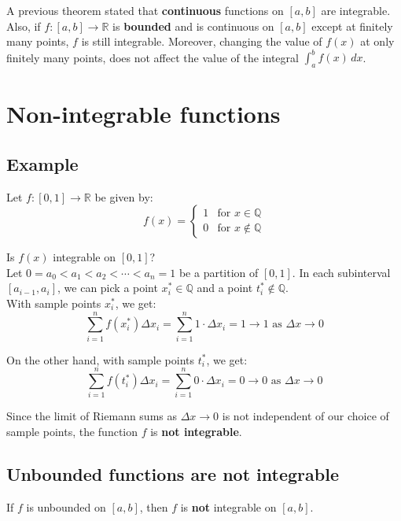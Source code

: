 \documentclass[11pt]{article}
\begin{document}
A previous theorem stated that \textbf{continuous} functions on \([a, b]\) are integrable.
\\[0pt]

Also, if \(f : [a, b] \rightarrow \mathbb{R}\) is \textbf{bounded} and is continuous on \([a, b]\) except at finitely many points, \(f\) is still integrable. Moreover, changing the value of \(f(x)\) at only finitely many points, does not affect the value of the integral \(\int_a^b f(x) \, dx\).


\section{Non-integrable functions}
\label{sec:org1be2553}

\subsection{Example}
\label{sec:orge4d9775}
Let \(f : [0, 1] \rightarrow \mathbb{R}\) be given by:
\[
f(x) = \begin{cases}
1 & \text{for } x \in \mathbb{Q} \\
0 & \text{for } x \notin \mathbb{Q}
\end{cases}
\]

Is \(f(x)\) integrable on \([0, 1]\)?
\\[0pt]

Let \(0 = a_0 < a_1 < a_2 < \cdots < a_n = 1\) be a partition of \([0, 1]\). In each subinterval \([a_{i - 1}, a_i]\), we can pick a point \(x_i^* \in \mathbb{Q}\) and a point \(t_i^* \notin \mathbb{Q}\).
\\[0pt]

With sample points \(x_i^*\), we get:
\[\sum_{i = 1}^n f(x_i^*) \Delta x_i = \sum_{i = 1}^n 1 \cdot \Delta x_i = 1 \rightarrow 1 \text{ as } \Delta x \rightarrow 0\]

On the other hand, with sample points \(t_i^*\), we get:
\[\sum_{i = 1}^n f(t_i^*) \Delta x_i = \sum _{i = 1}^n 0 \cdot \Delta x_i = 0 \rightarrow 0 \text{ as } \Delta x \rightarrow 0\]

Since the limit of Riemann sums as \(\Delta x \rightarrow 0\) is not independent of our choice of sample points, the function \(f\) is \textbf{not integrable}.

\subsection{Unbounded functions are not integrable}
\label{sec:orgcdbb0fe}
If \(f\) is unbounded on \([a, b]\), then \(f\) is \textbf{not} integrable on \([a, b]\).
\end{document}
